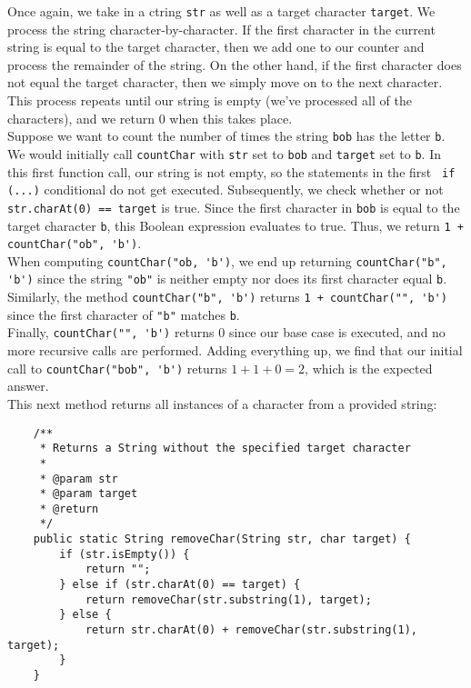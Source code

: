 Once again, we take in a ctring \verb!str! as well as a target character \verb!target!. We process the string character-by-character. If the first character in the current string is equal to the target character, then we add one to our counter and process the remainder of the string. On the other hand, if the first character does not equal the target character, then we simply move on to the next character. This process repeats until our string is empty (we've processed all of the characters), and we return $0$ when this takes place. \\

Suppose we want to count the number of times the string \verb!bob! has the letter \verb!b!. We would initially call \verb!countChar! with \verb!str! set to \verb!bob! and \verb!target! set to \verb!b!. In this first function call, our string is not empty, so the statements in the first  \verb! if (...)! conditional do not get executed. Subsequently, we check whether or not \verb!str.charAt(0) == target! is true. Since the first character in \verb!bob! is equal to the target character \verb!b!, this Boolean expression evaluates to true. Thus, we return \verb!1 + countChar("ob", 'b')!. \\

When computing \verb!countChar("ob, 'b')!, we end up returning \verb!countChar("b", 'b')! since the string \verb!"ob"! is neither empty nor does its first character equal \verb!b!. Similarly, the method \verb!countChar("b", 'b')! returns \verb!1 + countChar("", 'b')! since the first character of \verb!"b"! matches \verb!b!. \\

Finally, \verb!countChar("", 'b')! returns $0$ since our base case is executed, and no more recursive calls are performed. Adding everything up, we find that our initial call to \verb!countChar("bob", 'b')! returns $1 + 1 + 0 = 2$, which is the expected answer. \\

This next method returns all instances of a character from a provided string:

\begin{lstlisting}
	/**
	 * Returns a String without the specified target character
	 * 
	 * @param str
	 * @param target
	 * @return
	 */
	public static String removeChar(String str, char target) {
		if (str.isEmpty()) {
			return "";
		} else if (str.charAt(0) == target) {
			return removeChar(str.substring(1), target);
		} else {
			return str.charAt(0) + removeChar(str.substring(1), target);
		}
	}

\end{lstlisting}

